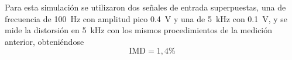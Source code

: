 
Para esta simulación se utilizaron dos señales de entrada superpuestas, una de frecuencia de \SI{100}{\Hz} con amplitud pico \SI{0.4}{\volt} y una de \SI{5}{\kHz} con \SI{0.1}{\volt}, y se mide la distorsión en \SI{5}{\kHz} con los mismos procedimientos de la medición anterior, obteniéndose 
$$ \mathrm{IMD} = 1,4\% $$


